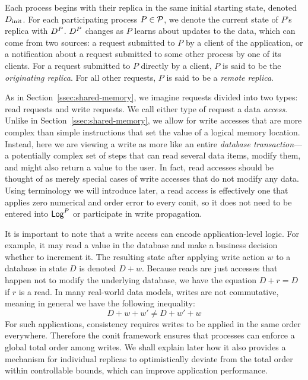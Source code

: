 \documentclass[]             %
{NASA}                       %
\theoremstyle{definition}
\begin{document}
Each process begins with their replica in the same initial starting
state, denoted $D_\textrm{init}$. For each participating process
$P \in \mathcal{P}$, we denote the current state of $P$'s replica with
$D^{P}$. $D^{P}$ changes as $P$ learns about updates to the data, which
can come from two sources: a request submitted to $P$ by a client of
the application, or a notification about a request submitted to some
other process by one of its clients. For a request submitted to $P$
directly by a client, $P$ is said to be the \emph{originating
  replica}. For all other requests, $P$ is said to be a \emph{remote
  replica}.

As in Section~\ref{ssec:shared-memory}, we imagine requests divided
into two types: read requests and write requests. We call either type
of request a data \emph{access}. Unlike in
Section~\ref{ssec:shared-memory}, we allow for write accesses that are
more complex than simple instructions that set the value of a logical
memory location. Instead, here we are viewing a write as more like an
entire \emph{database transaction}---a potentially complex set of
steps that can read several data items, modify them, and might also
return a value to the user. In fact, read accesses should be thought
of as merely special cases of write accesses that do not modify any
data. Using terminology we will introduce later, a read access is
effectively one that applies zero numerical and order error to every
conit, so it does not need to be entered into $\mathsf{Log}^{P}$ or participate
in write propagation.

It is important to note that a write access can encode
application-level logic. For example, it may read a value in the
database and make a business decision whether to increment it. The
resulting state after applying write action $w$ to a database in state
$D$ is denoted $D + w$. Because reads are just accesses that happen
not to modify the underlying database, we have the equation
$D + r = D$ if $r$ is a read. In many real-world data models, writes
are not commutative, meaning in general we have the following
inequality:
\begin{equation}
  D + w + w' \neq D + w' + w \label{eq:conit-non-commutative}
\end{equation}
For such applications, consistency requires writes to be applied in
the same order everywhere. Therefore the conit framework ensures that
processes can enforce a global total order among writes. We shall
explain later how it also provides a mechanism for individual replicas
to optimistically deviate from the total order within controllable
bounds, which can improve application performance.
\end{document}
